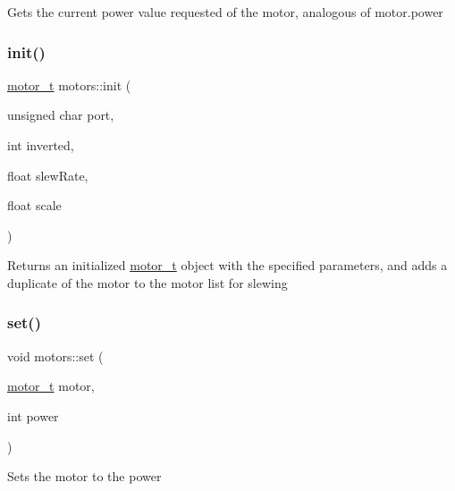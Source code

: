 Gets the current power value requested of the motor, analogous of motor.\+power \mbox{\label{namespacemotors_ac24174d8f1da14c7577c91249e35c2e6}} 
\subsubsection{\texorpdfstring{init()}{init()}}
{\footnotesize\ttfamily \hyperlink{structmotor__t}{motor\+\_\+t} motors\+::init (\begin{DoxyParamCaption}\item[{unsigned char}]{port,  }\item[{int}]{inverted,  }\item[{float}]{slew\+Rate,  }\item[{float}]{scale }\end{DoxyParamCaption})}

Returns an initialized \hyperlink{structmotor__t}{motor\+\_\+t} object with the specified parameters, and adds a duplicate of the motor to the motor list for slewing \mbox{\label{namespacemotors_a1d018a7911884ab27f16d91f8c65d581}} 
\subsubsection{\texorpdfstring{set()}{set()}}
{\footnotesize\ttfamily void motors\+::set (\begin{DoxyParamCaption}\item[{\hyperlink{structmotor__t}{motor\+\_\+t}}]{motor,  }\item[{int}]{power }\end{DoxyParamCaption})}

Sets the motor to the power 